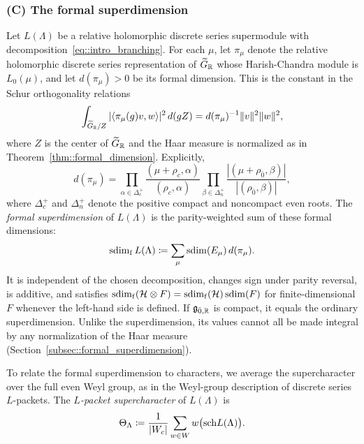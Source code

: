 \subsubsection*{(C) The formal superdimension} Let $L(\Lambda)$ be a relative holomorphic discrete series supermodule with
decomposition~\eqref{eq::intro_branching}. For each $\mu$, let $\pi_\mu$
denote the relative holomorphic discrete series representation of
$\widetilde G_{{\mathbb R}}$ whose Harish-Chandra module is $L_0(\mu)$, and let
$d(\pi_\mu)>0$ be its formal dimension. This is the constant in the Schur
orthogonality relations
\begin{equation}\label{eq::intro_schur_orthogonality}
\int_{\widetilde G_{{\mathbb R}}/Z}|\langle\pi_\mu(g)v,w\rangle|^2\,d(gZ)
=d(\pi_\mu)^{-1}\|v\|^2\|w\|^2,
\end{equation}
where $Z$ is the center of $\widetilde G_{{\mathbb R}}$ and the Haar measure is
normalized as in Theorem~\ref{thm::formal_dimension}. Explicitly,
\begin{equation}\label{eq::intro_formal_dimension}
d(\pi_\mu)
=\prod_{\alpha\in\Delta_c^+}
\frac{(\mu+\rho_c,\alpha)}{(\rho_c,\alpha)}
\prod_{\beta\in\Delta_n^+}
\frac{|(\mu+\rho_{\bar0},\beta)|}{|(\rho_{\bar0},\beta)|},
\end{equation}
where $\Delta_c^+$ and $\Delta_n^+$ denote the positive compact and
noncompact even roots. The \emph{formal superdimension} of $L(\Lambda)$ is
the parity-weighted sum of these formal dimensions:
\begin{equation}\label{eq::intro_fsdim}
\operatorname{sdim}_{\mathrm f} L(\Lambda)\coloneqq\sum_\mu\operatorname{sdim}(E_\mu)\,d(\pi_\mu).
\end{equation}
 It is independent of the chosen decomposition, changes sign under parity reversal, is additive, and satisfies $\operatorname{sdim}_{\mathrm f}({\mathcal{H}}\otimes F)=\operatorname{sdim}_{\mathrm f}({\mathcal{H}})\operatorname{sdim}(F)$ for finite-dimensional $F$ whenever the left-hand side is defined. If ${\mathfrak{g}}_{\bar0,{\mathbb R}}$ is compact, it equals the ordinary superdimension. Unlike the superdimension, its values cannot all be made integral by any normalization of the Haar measure (Section~\ref{subsec::formal_superdimension}).

To relate the formal superdimension to characters, we average the
supercharacter over the full even Weyl group, as in the Weyl-group
description of discrete series $L$-packets. The \emph{$L$-packet
supercharacter} of $L(\Lambda)$ is
\begin{equation}\label{eq::intro_L_packet}
\Theta_\Lambda
\coloneqq
\frac{1}{|W_c|}\sum_{w\in W}w\bigl({\operatorname{sch}} L(\Lambda)\bigr).
\end{equation}

